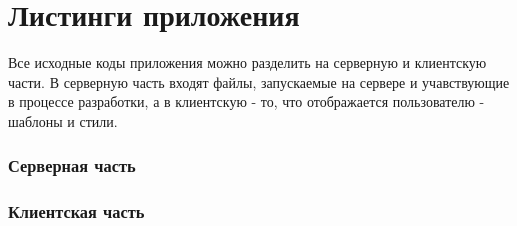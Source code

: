 \part{Листинги приложения}

Все исходные коды приложения можно разделить на серверную и клиентскую части. В серверную часть входят файлы, запускаемые на сервере и учавствующие в процессе разработки, а в клиентскую - то, что отображается пользователю - шаблоны и стили.

\section{Серверная часть}










\section{Клиентская часть}